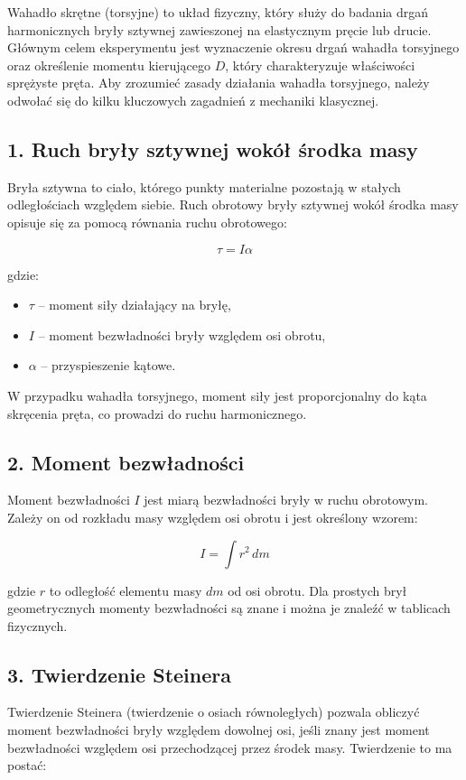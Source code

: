 \documentclass{article}
\begin{document}
{Wahadło skrętne (torsyjne) to układ fizyczny, który służy do badania drgań harmonicznych bryły sztywnej zawieszonej na elastycznym pręcie lub drucie. Głównym celem eksperymentu jest wyznaczenie okresu drgań wahadła torsyjnego oraz określenie momentu kierującego \( D \), który charakteryzuje właściwości sprężyste pręta. Aby zrozumieć zasady działania wahadła torsyjnego, należy odwołać się do kilku kluczowych zagadnień z mechaniki klasycznej.

\subsection*{1. Ruch bryły sztywnej wokół środka masy}
Bryła sztywna to ciało, którego punkty materialne pozostają w stałych odległościach względem siebie. Ruch obrotowy bryły sztywnej wokół środka masy opisuje się za pomocą równania ruchu obrotowego:

\[
\tau = I \alpha
\]

gdzie:
\begin{itemize}
    \item \(\tau\) – moment siły działający na bryłę,
    \item \(I\) – moment bezwładności bryły względem osi obrotu,
    \item \(\alpha\) – przyspieszenie kątowe.
\end{itemize}

W przypadku wahadła torsyjnego, moment siły jest proporcjonalny do kąta skręcenia pręta, co prowadzi do ruchu harmonicznego.

\subsection*{2. Moment bezwładności}
Moment bezwładności \( I \) jest miarą bezwładności bryły w ruchu obrotowym. Zależy on od rozkładu masy względem osi obrotu i jest określony wzorem:

\[
I = \int r^2 \, dm
\]

gdzie \( r \) to odległość elementu masy \( dm \) od osi obrotu. Dla prostych brył geometrycznych momenty bezwładności są znane i można je znaleźć w tablicach fizycznych.

\subsection*{3. Twierdzenie Steinera}
Twierdzenie Steinera (twierdzenie o osiach równoległych) pozwala obliczyć moment bezwładności bryły względem dowolnej osi, jeśli znany jest moment bezwładności względem osi przechodzącej przez środek masy. Twierdzenie to ma postać:

}
\end{document}
